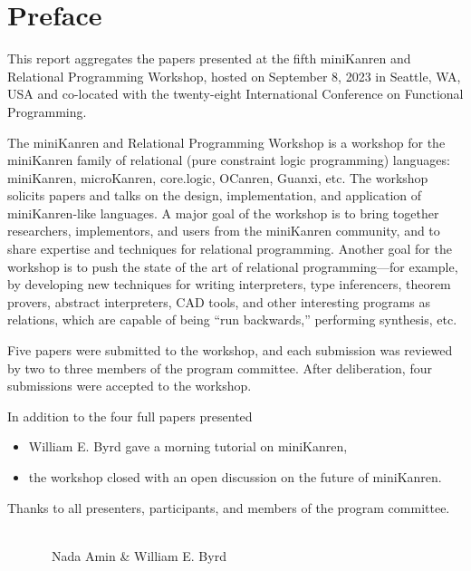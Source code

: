 \documentclass[a4paper]{book}
\date{September 8, 2023}
\author{Nada Amin \and William E. Byrd}
\begin{document}
\frontmatter
\setcounter{page}{3}  %
\chapter*{Preface}
This report aggregates the papers presented at the fifth miniKanren
and Relational Programming Workshop, hosted on September 8, 2023 in
Seattle, WA, USA and co-located with the twenty-eight International
Conference on Functional Programming.

\vspace{5pt}
\noindent
The miniKanren and Relational Programming Workshop is a workshop for the miniKanren family of relational (pure constraint logic programming) languages: miniKanren, microKanren, core.logic, OCanren, Guanxi, etc. The workshop solicits papers and talks on the design, implementation, and application of miniKanren-like languages. A major goal of the workshop is to bring together researchers, implementors, and users from the miniKanren community, and to share expertise and techniques for relational programming. Another goal for the workshop is to push the state of the art of relational programming—for example, by developing new techniques for writing interpreters, type inferencers, theorem provers, abstract interpreters, CAD tools, and other interesting programs as relations, which are capable of being “run backwards,” performing synthesis, etc.

\vspace{5pt}
\noindent
Five papers were submitted to the workshop, and each submission was reviewed by
two to three members of the program committee.  After deliberation, four submissions were accepted to the workshop.

\vspace{5pt}
\noindent
In addition to the four full papers presented
\begin{itemize}
\item William E. Byrd gave a morning tutorial on miniKanren,
\item the workshop closed with an open discussion on the future of miniKanren.
\end{itemize}

\vspace{5pt}
\noindent
Thanks to all presenters, participants, and members of the
program committee.

\ \\

\ \ \ \ \ \ \ Nada Amin \& William E. Byrd
\end{document}
